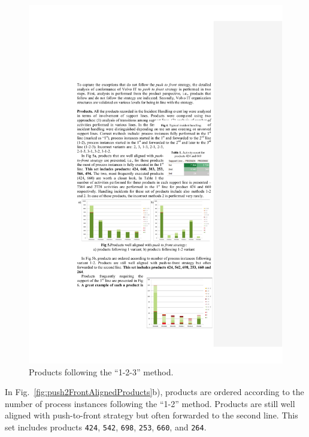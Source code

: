 \documentclass[lnbip]{svmultln}
\begin{document}

\begin{figure}
  \vspace{-20pt}
  \begin{center}
		\includegraphics[width=.45\textwidth]{"figs/pic 8"}
  \end{center}
\caption{Products following the ``1-2-3'' method.}
\label{fig:push2Front3rdLineProducts}
  \vspace{-10pt}
\end{figure}
In Fig.~\ref{fig:push2FrontAlignedProducts}b), products are ordered according to the number of process instances following the ``1-2'' method. Products are still well aligned with push-to-front strategy but often forwarded to the second line. This set includes products \texttt{424}, \texttt{542}, \texttt{698}, \texttt{253}, \texttt{660}, and \texttt{264}.
\end{document}

